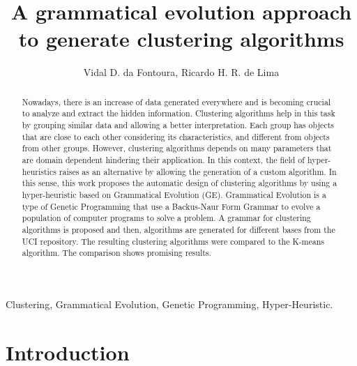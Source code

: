 \documentclass[journal]{IEEEtran}
\begin{document}
	
	\title{A grammatical evolution approach to generate clustering algorithms}
	
	
	\author{
		Vidal D. da Fontoura,
		Ricardo H. R. de Lima
	}
	
	
	\maketitle
	
	\begin{abstract}
		Nowadays, there is an increase of data generated everywhere and is becoming crucial to analyze and extract the hidden information. Clustering algorithms help in this task by grouping similar data and allowing a better interpretation. Each group has objects that are close to each other considering its characteristics, and different from objects from other groups. However, clustering algorithms depends on many parameters that are domain dependent hindering their application. In this context, the field of hyper-heuristics raises as an alternative by allowing the generation of a custom algorithm. In this sense, this work proposes the automatic design of clustering algorithms by using a hyper-heuristic based on Grammatical Evolution (GE). Grammatical Evolution is a type of Genetic Programming that use a Backus-Naur Form Grammar to evolve a population of computer programs to solve a problem. A grammar for clustering algorithms is proposed and then, algorithms are generated for different bases from the UCI repository. The resulting clustering algorithms were compared to the K-means algorithm. The comparison shows promising results. 
		

		
	\end{abstract}
	
	\begin{IEEEkeywords}
		Clustering, Grammatical Evolution, Genetic Programming, Hyper-Heuristic.
	\end{IEEEkeywords}
	
	\IEEEpeerreviewmaketitle
	
	
	\section{Introduction}
	
\end{document}
